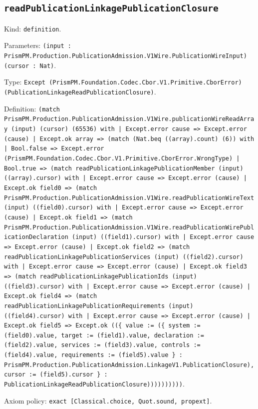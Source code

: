 \documentclass[11pt]{article}
\begin{document}
\subsection*{\texttt{readPublicationLinkagePublicationClosure}}
\noindent Kind: \texttt{definition}.\par
\noindent Parameters: \texttt{(input : PrismPM.Production.PublicationAdmission.V1Wire.PublicationWireInput) (cursor : Nat)}.\par
\noindent Type: \texttt{Except (PrismPM.Foundation.Codec.Cbor.V1.Primitive.CborError) (PublicationLinkageReadPublicationClosure)}.\par
\noindent Definition: \texttt{(match PrismPM.Production.PublicationAdmission.V1Wire.publicationWireReadArray (input) (cursor) (65536) with | Except.error cause => Except.error (cause) | Except.ok array => (match (Nat.beq ((array).count) (6)) with | Bool.false => Except.error (PrismPM.Foundation.Codec.Cbor.V1.Primitive.CborError.WrongType) | Bool.true => (match readPublicationLinkagePublicationMember (input) ((array).cursor) with | Except.error cause => Except.error (cause) | Except.ok field0 => (match PrismPM.Production.PublicationAdmission.V1Wire.readPublicationWireText (input) ((field0).cursor) with | Except.error cause => Except.error (cause) | Except.ok field1 => (match PrismPM.Production.PublicationAdmission.V1Wire.readPublicationWirePublicationDeclaration (input) ((field1).cursor) with | Except.error cause => Except.error (cause) | Except.ok field2 => (match readPublicationLinkagePublicationServices (input) ((field2).cursor) with | Except.error cause => Except.error (cause) | Except.ok field3 => (match readPublicationLinkagePublicationIds (input) ((field3).cursor) with | Except.error cause => Except.error (cause) | Except.ok field4 => (match readPublicationLinkagePublicationRequirements (input) ((field4).cursor) with | Except.error cause => Except.error (cause) | Except.ok field5 => Except.ok ((\{ value := (\{ system := (field0).value, target := (field1).value, declaration := (field2).value, services := (field3).value, controls := (field4).value, requirements := (field5).value \} : PrismPM.Production.PublicationAdmission.LinkageV1.PublicationClosure), cursor := (field5).cursor \} : PublicationLinkageReadPublicationClosure))))))))))}.\par
\noindent Axiom policy: \texttt{exact [Classical.choice, Quot.sound, propext]}.\par
\end{document}
